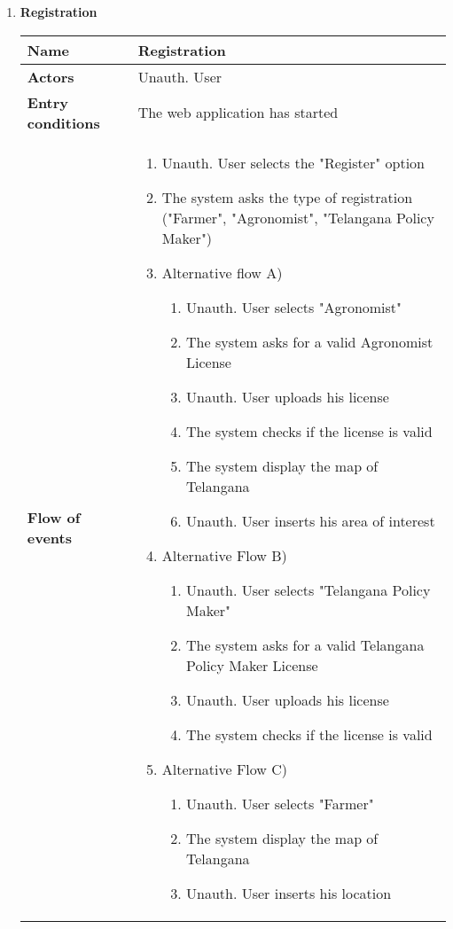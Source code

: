 		\begin{enumerate}
			\item \textbf{Registration} 
				\begin{longtable}{p{0.26\linewidth}p{0.75\linewidth}}
					\toprule
					\textbf{Name} & \textbf{Registration} \\
					\midrule
					\textbf{Actors} & Unauth. User \\
					\midrule
					\textbf{Entry conditions} & The web application has started \\
					\midrule
					\textbf{Flow of events} & 
					\begin{enumerate}
						\item Unauth. User selects the "Register" option
						\item The system asks the type of registration ("Farmer", "Agronomist", "Telangana Policy Maker")
						\item Alternative flow A)
						\begin{enumerate}
							\item Unauth. User selects "Agronomist"
							\item The system asks for a valid Agronomist License
							\item Unauth. User uploads his license
							\item The system checks if the license is valid
							\item The system display the map of Telangana
							\item Unauth. User inserts his area of interest
						\end{enumerate}
						\item Alternative Flow B)
						\begin{enumerate}
							\item Unauth. User selects "Telangana Policy Maker"
							\item The system asks for a valid Telangana Policy Maker License
							\item Unauth. User uploads his license
							\item The system checks if the license is valid
						\end{enumerate}
						\item Alternative Flow C)
						\begin{enumerate}
							\item Unauth. User selects "Farmer"
							\item The system display the map of Telangana
							\item Unauth. User inserts his location

\end{enumerate}
\end{enumerate}
\end{longtable}
\end{enumerate}
